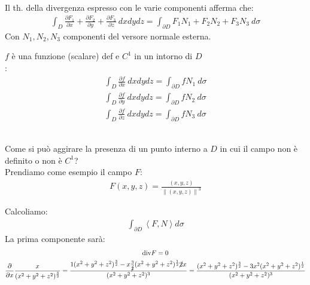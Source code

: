 \documentclass[a4paper, oneside]{article}
\begin{document}
\hfil\\
Il th. della divergenza espresso con le varie componenti afferma che:
\begin{gather*}
  \int_D \frac{\partial F_1}{\partial x} + \frac{\partial F_2}{\partial y} + \frac{\partial F_3}{\partial z} \ dxdydz = \int_{\partial D} F_1 N_1 + F_2 N_2 + F_3 N_3 \ d\sigma
\end{gather*}
Con $N_1,N_2,N_3$ componenti del versore normale esterna.
\begin{proposition}
   $f$ è una funzione (scalare) def e $C^1$ in un intorno di $D$\\
  :
  \begin{gather*}
    \int_D \frac{\partial f}{\partial x} \ dxdydz = \int_{\partial D} f N_1 \ d\sigma \\
    \int_D \frac{\partial f}{\partial y} \ dxdydz = \int_{\partial D} f N_2 \ d\sigma \\
    \int_D \frac{\partial f}{\partial z} \ dxdydz = \int_{\partial D} f N_3 \ d\sigma
  \end{gather*}
\end{proposition}
\hfill\\
Come si può aggirare la presenza di un punto interno a $D$ in cui il campo non è definito o non è $C^1$?\\
Prendiamo come esempio il campo $F$:
\begin{gather*}
  F(x,y,z) = \frac{(x,y,z)}{\left\lVert (x,y,z) \right\rVert^3}
\end{gather*}
\begin{center}
\end{center}
Calcoliamo:
\begin{gather*}
  \int_{\partial D} \left\langle F , N \right\rangle d\sigma
\end{gather*}
La prima componente sarà:
\begin{gather*}
  \text{div}F = 0\\
  \frac{\partial}{\partial x} \frac{x}{(x^2+y^2+z^2)^{\frac{3}{2}}} = \frac{1(x^2+y^2+z^2)^{\frac{3}{2}} - x\frac{3}{\cancel{2}} (x^2+y^2+z^2)^{\frac{1}{2}} \cancel{2}x}{(x^2+y^2+z^2)^3} = \frac{(x^2+y^2+z^2)^\frac{3}{2} - 3x^2 (x^2+y^2+z^2)^\frac{1}{2} }{(x^2+y^2+z^2)^3}\\
\end{gather*}
\end{document}
